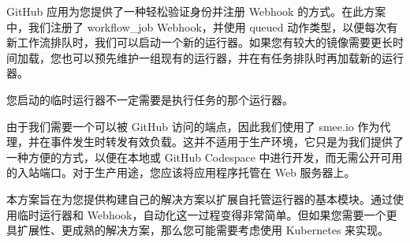 
GitHub 应用为您提供了一种轻松验证身份并注册 Webhook 的方式。在此方案中，我们注册了 workflow\_job Webhook，并使用 queued 动作类型，以便每次有新工作流排队时，我们可以启动一个新的运行器。如果您有较大的镜像需要更长时间加载，您也可以预先维护一组现有的运行器，并在有任务排队时再加载新的运行器。

您启动的临时运行器不一定需要是执行任务的那个运行器。

由于我们需要一个可以被 GitHub 访问的端点，因此我们使用了 smee.io 作为代理，并在事件发生时转发有效负载。这并不适用于生产环境，它只是为我们提供了一种方便的方式，以便在本地或 GitHub Codespace 中进行开发，而无需公开可用的入站端口。对于生产用途，您应该将应用程序托管在 Web 服务器上。


本方案旨在为您提供构建自己的解决方案以扩展自托管运行器的基本模块。通过使用临时运行器和 Webhook，自动化这一过程变得非常简单。但如果您需要一个更具扩展性、更成熟的解决方案，那么您可能需要考虑使用 Kubernetes 来实现。

